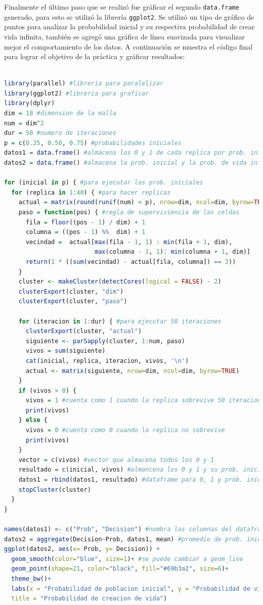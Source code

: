 \documentclass{article}
\begin{document}
Finalmente el último paso que se realizó fue gráficar el segundo \texttt{data.frame} generado,  para esto se utilizó la librería \texttt{ggplot2}. Se utilizó un tipo de gráfico de puntos para analizar la probabilidad inicial y su respectiva probabilidad de crear vida infinita, también se agregó una gráfica de línea suavizada para visualizar mejor el comportamiento de los datos. A continuación se muestra el código final para lograr el objetivo de la práctica y gráficar resultados:

\begin{lstlisting}[language=R]

library(parallel) #libreria para paralelizar
library(ggplot2) #libreria para graficar
library(dplyr) 
dim = 18 #dimension de la malla
num = dim^2
dur = 50 #numero de iteraciones
p = c(0.25, 0.50, 0.75) #probabilidades iniciales
datos1 = data.frame() #almacena los 0 y 1 de cada replica por prob. inicial
datos2 = data.frame() #almacena la prob. inicial y la prob. de vida infinita

for (inicial in p) { #para ejecutar las prob. iniciales
  for (replica in 1:40) { #para hacer replicas
    actual = matrix(round(runif(num) < p), nrow=dim, ncol=dim, byrow=TRUE)
    paso = function(pos) { #regla de superviviencia de las celdas
      fila = floor((pos - 1) / dim) + 1
      columna = ((pos - 1) %%  dim) + 1
      vecindad =  actual[max(fila - 1, 1) : min(fila + 1, dim), 
                         max(columna - 1, 1): min(columna + 1, dim)]
      return(1 * ((sum(vecindad) - actual[fila, columna]) == 3))
    }
    cluster <- makeCluster(detectCores(logical = FALSE) - 2)
    clusterExport(cluster, "dim")
    clusterExport(cluster, "paso")
    
    for (iteracion in 1:dur) { #para ejecutar 50 iteraciones
      clusterExport(cluster, "actual")
      siguiente <- parSapply(cluster, 1:num, paso)
      vivos = sum(siguiente)
      cat(inicial, replica, iteracion, vivos, '\n')
      actual <- matrix(siguiente, nrow=dim, ncol=dim, byrow=TRUE)
    }
    if (vivos > 0) {
      vivos = 1 #cuenta como 1 cuando la replica sobrevive 50 iteraciones
      print(vivos)
    } else {
      vivos = 0 #cuenta como 0 cuando la replica no sobrevive
      print(vivos)
    }
    vector = c(vivos) #vector que almacena todos los 0 y 1
    resultado = c(inicial, vivos) #almancena los 0 y 1 y su prob. inicial
    datos1 = rbind(datos1, resultado) #dataframe para 0, 1 y prob. inicial
    stopCluster(cluster)
  }
}

names(datos1) <- c("Prob", "Decision") #nombra las columnas del dataframe
datos2 = aggregate(Decision~Prob, datos1, mean) #promedio de prob. inicial
ggplot(datos2, aes(x= Prob, y= Decision)) + 
  geom_smooth(color="blue", size=1)+ #se puede cambiar a geom_line
  geom_point(shape=21, color="black", fill="#69b3a2", size=6)+
  theme_bw()+
  labs(x = "Probabilidad de poblacion inicial", y = "Probabilidad de vida infinita", 
  title = "Probabilidad de creacion de vida")

\end{lstlisting}
\end{document}
